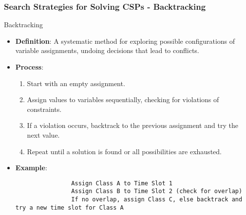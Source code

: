\documentclass[aspectratio=169]{beamer}
\begin{document}
\begin{frame}[fragile]
    \frametitle{Search Strategies for Solving CSPs - Backtracking}
    \begin{block}{Backtracking}
        \begin{itemize}
            \item \textbf{Definition}: A systematic method for exploring possible configurations of variable assignments, undoing decisions that lead to conflicts.
            \item \textbf{Process}:
            \begin{enumerate}
                \item Start with an empty assignment.
                \item Assign values to variables sequentially, checking for violations of constraints.
                \item If a violation occurs, backtrack to the previous assignment and try the next value.
                \item Repeat until a solution is found or all possibilities are exhausted.
            \end{enumerate}
            \item \textbf{Example}:
            \begin{lstlisting}
                Assign Class A to Time Slot 1
                Assign Class B to Time Slot 2 (check for overlap)
                If no overlap, assign Class C, else backtrack and try a new time slot for Class A
            \end{lstlisting}
        \end{itemize}
    \end{block}
\end{frame}
\end{document}
